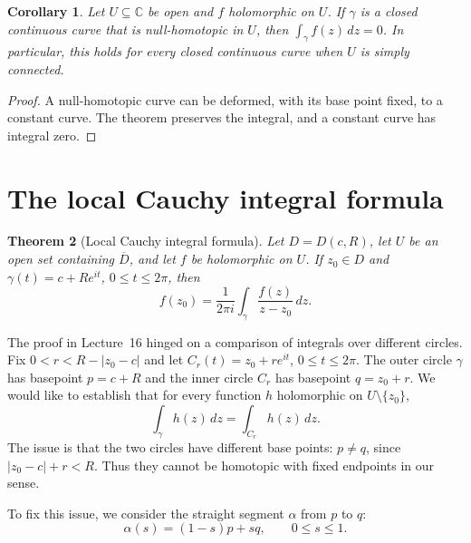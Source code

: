 \documentclass[11pt]{article}
\theoremstyle{plain}
\newtheorem{theorem}{Theorem}[section]
\newtheorem{corollary}[theorem]{Corollary}
\theoremstyle{definition}
\theoremstyle{remark}
\numberwithin{equation}{section}
\newcommand{\C}{\mathbb{C}}
\begin{document}
\begin{corollary}\label{cor:null}
Let $U\subseteq\C$ be open and $f$ holomorphic on $U$.
If $\gamma$ is a closed continuous curve that is null-homotopic in $U$,
then $\int_\gamma f(z)\,dz=0$.
In particular, this holds for every closed continuous curve when $U$ is
simply connected.
\end{corollary}
\begin{proof}
A null-homotopic curve can be deformed, with its base point fixed, to a
constant curve. The theorem preserves the integral, and a constant
curve has integral zero.
\end{proof}


\section{The local Cauchy integral formula}
\begin{theorem}[Local Cauchy integral formula]\label{thm:cauchy-formula}
Let $D=D(c,R)$, let $U$ be an open set containing $\overline D$, and
let $f$ be holomorphic on $U$. If $z_0\in D$ and
$\gamma(t)=c+Re^{it}$, $0\leq t\leq2\pi$, then
\[
 \boxed{\displaystyle f(z_0)=\frac{1}{2\pi i}
 \int_\gamma\frac{f(z)}{z-z_0}\,dz.}
\]
\end{theorem}

The proof in Lecture~16 hinged on a comparison of integrals over
different circles. Fix $0<r<R-|z_0-c|$ and let $C_r(t)=z_0+re^{it}$,
$0\leq t\leq2\pi$. The outer circle $\gamma$ has basepoint $p=c+R$ and
the inner circle $C_r$ has basepoint $q=z_0+r$. We would like to
establish that for every function $h$ holomorphic on $U\setminus\{z_0\}$,
\begin{equation}\label{eq:circle-comparison}
 \int_\gamma h(z)\,dz=\int_{C_r}h(z)\,dz.
\end{equation}
The issue is that the two circles have different base points:
$p\neq q$, since $|z_0-c|+r<R$. Thus they cannot be homotopic with
fixed endpoints in our sense.

To fix this issue, we consider the straight segment $\alpha$ from
$p$ to $q$:
\[
 \alpha(s)=(1-s)p+sq,\qquad 0\leq s\leq1.
\]
\end{document}
